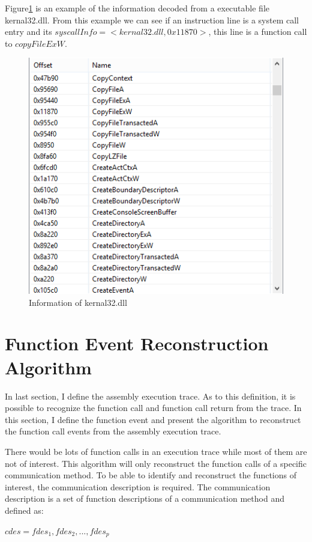 Figure\ref{executable} is an example of the information decoded from a executable file kernal32.dll. From this example we can see if an instruction line is a system call entry and its $syscallInfo = <kernal32.dll, 0x11870>$, this line is a function call to $copyFileExW$.

\begin{figure}[H]
\centerline{\includegraphics[scale=0.6]{Figures/executable}}
\caption{Information of kernal32.dll}
\label{executable}
\end{figure}

\section{Function Event Reconstruction Algorithm}
In last section, I define the assembly execution trace. As to this definition, it is possible to recognize the function call and function call return from the trace.  In this section, I define the function event and present the algorithm to reconstruct the function call events from the assembly execution trace. 

There would be lots of function calls in an execution trace while most of them are not of interest. This algorithm will only reconstruct the function calls of a specific communication method. To be able to identify and reconstruct the functions of interest, the communication description is required. The communication description is a set of function descriptions of a communication method and defined as:

$cdes = {fdes_1, fdes_2,...,fdes_p}$

